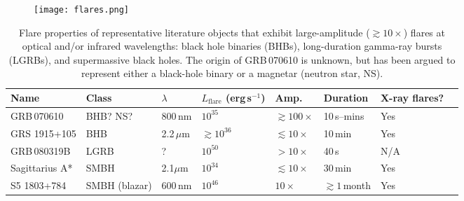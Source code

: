 \documentclass{nature_plusfigure}
\newcommand{\at}{AT2022tsd}
\begin{document}
\begin{figure*}
\centering
    \begin{subfigure}[t]{1.0\textwidth}
         \centering
         \texttt{[image: flares.png]}
     \end{subfigure}
\caption{\textbf{Collage of \at\ optical flares.} Flares are defined as detections with S/N$>5$ after MJD 59856.4. For the ULTRASPEC observations, points with S/N$>5$ are filled in, and the $g$-band inset shows the light curve smoothed using a 3-minute running average. Flux densities have been corrected for Milky Way extinction. The approximate $g$-band luminosity ($\nu L_\nu$) is also shown.}
 \label{fig:flare-collage}
\end{figure*}


\begin{table}
    \centering
    \begin{tabular}{l|l|l|l|l|l|l|l}
    \hline\hline
     Name & Class & $\lambda$ & $L_\mathrm{flare}$ (erg\,s$^{-1}$) & Amp. & Duration & X-ray flares? \\
     \hline
    GRB\,070610 & BHB?\cite{Kasliwal2008} NS?\cite{CastroTirado2008,Stefanescu2008} & 800\,nm & $10^{35}$ & $\gtrsim100\times$ & 10\,s--mins & Yes \\
    GRS 1915+105 & BHB & 2.2\,$\mu$m\cite{Fender1997} & $\gtrsim10^{36}$ & $\lesssim 10\times$ & 10\,min & Yes \\
    GRB\,080319B & LGRB & ?\cite{Racusin2008} & $10^{50}$ & $>10\times$ & 40\,s & N/A \\
    Sagittarius A* & SMBH & 2.1$\mu$m\cite{Marrone2008} & $10^{34}$ & $\lesssim 10\times$ & 30\,min & Yes \\
    S5 1803+784 & SMBH (blazar) & 600\,nm\cite{Nesci2021} & $10^{46}$ & $10\times$ & $\gtrsim1\,$month & Yes \\
    \hline\hline
    \end{tabular}
    \caption{Flare properties of representative literature objects that exhibit large-amplitude ($\gtrsim10\times$) flares at optical and/or infrared wavelengths: black hole binaries (BHBs), long-duration gamma-ray bursts (LGRBs), and supermassive black holes. The origin of GRB\,070610 is unknown, but has been argued to represent either a black-hole binary or a magnetar (neutron star, NS).}
    \label{tab:flaring-classes}
\end{table}

\clearpage

\end{document}

